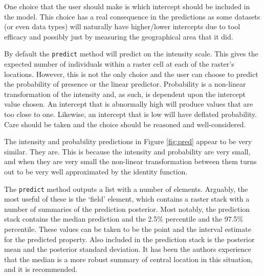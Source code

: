 \documentclass[article,shortnames,nojss]{jss}\usepackage[]{graphicx}\usepackage[]{xcolor}
\begin{document}
One choice that the user should make is which intercept should be included in the model. This choice has a real consequence in the predictions as some datasets (or even data types) will naturally have higher/lower intercepts due to tool efficacy and possibly just by measuring the geographical area that it did.

By default the \texttt{predict} method will predict on the intensity scale. This gives the expected number of individuals within a raster cell at each of the raster's locations. However, this is not the only choice and the user can choose to predict the probability of presence or the linear predictor. Probability is a non-linear transformation of the intensity and, as such, is dependent upon the intercept value chosen. An intercept that is abnormally high will produce values that are too close to one. Likewise, an intercept that is low will have deflated probability. Care should be taken and the choice should be reasoned and well-considered.

The intensity and probability predictions in Figure \ref{fig:pred} appear to be very similar. They are. This is because the intensity and probability are very small, and when they are very small the non-linear transformation between them turns out to be very well approximated by the identity function.
  
The \texttt{predict} method outputs a list with a number of elements. Arguably, the most useful of these is the `field' element, which contains a raster stack with a number of summaries of the prediction posterior. Most notably, the prediction stack contains the median prediction and the 2.5\% percentile and the 97.5\% percentile. These values can be taken to be the point and the interval estimate for the predicted property. Also included in the prediction stack is the posterior mean and the posterior standard deviation. It has been the authors experience that the median is a more robust summary of central location in this situation, and it is recommended.
  
\end{document}
